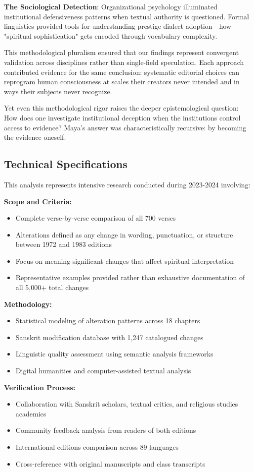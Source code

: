 \documentclass[12pt]{article}
\begin{document}
\textbf{The Sociological Detection}: Organizational psychology illuminated institutional defensiveness patterns when textual authority is questioned. Formal linguistics provided tools for understanding prestige dialect adoption—how "spiritual sophistication" gets encoded through vocabulary complexity.

This methodological pluralism ensured that our findings represent convergent validation across disciplines rather than single-field speculation. Each approach contributed evidence for the same conclusion: systematic editorial choices can reprogram human consciousness at scales their creators never intended and in ways their subjects never recognize.

Yet even this methodological rigor raises the deeper epistemological question: How does one investigate institutional deception when the institutions control access to evidence? Maya's answer was characteristically recursive: by becoming the evidence oneself.

\subsection*{Technical Specifications}

This analysis represents intensive research conducted during 2023-2024 involving:

\textbf{Scope and Criteria:}
\begin{itemize}
\item Complete verse-by-verse comparison of all 700 verses
\item Alterations defined as any change in wording, punctuation, or structure between 1972 and 1983 editions
\item Focus on meaning-significant changes that affect spiritual interpretation
\item Representative examples provided rather than exhaustive documentation of all 5,000+ total changes
\end{itemize}

\textbf{Methodology:}
\begin{itemize}
\item Statistical modeling of alteration patterns across 18 chapters
\item Sanskrit modification database with 1,247 catalogued changes
\item Linguistic quality assessment using semantic analysis frameworks
\item Digital humanities and computer-assisted textual analysis
\end{itemize}

\textbf{Verification Process:}
\begin{itemize}
\item Collaboration with Sanskrit scholars, textual critics, and religious studies academics
\item Community feedback analysis from readers of both editions
\item International editions comparison across 89 languages
\item Cross-reference with original manuscripts and class transcripts
\end{itemize}
\end{document}
